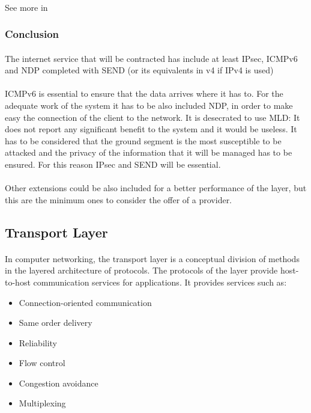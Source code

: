 \paragraph{}
See more in \cite{MLD}


\subsubsection{Conclusion}
\paragraph{}
The internet service that will be contracted has include at least IPsec, ICMPv6 and NDP completed with SEND (or its equivalents in v4 if IPv4 is used)
\paragraph{} 
ICMPv6 is essential to ensure that the data arrives where it has to. For the adequate work of the system it has to be also included  NDP, in order to make easy the connection of the client to the network. It is desecrated to use MLD: It does not report any significant benefit to the system and it would be useless. It has to be considered that the ground segment is the most susceptible to be attacked and the privacy of the information that it will be managed has to be ensured. For this reason IPsec and SEND will be essential.
\paragraph{}
Other extensions could be also included for a better performance of the layer, but this are the minimum ones to consider the offer of a provider.

\subsection{Transport Layer}
\paragraph{}
In computer networking, the transport layer is a conceptual division of methods in the layered architecture of protocols.  The protocols of the layer provide host-to-host communication services for applications. It provides services such as:
\begin{itemize}
\item Connection-oriented communication
\item Same order delivery
\item Reliability
\item Flow control
\item Congestion avoidance
\item Multiplexing
\end{itemize}
